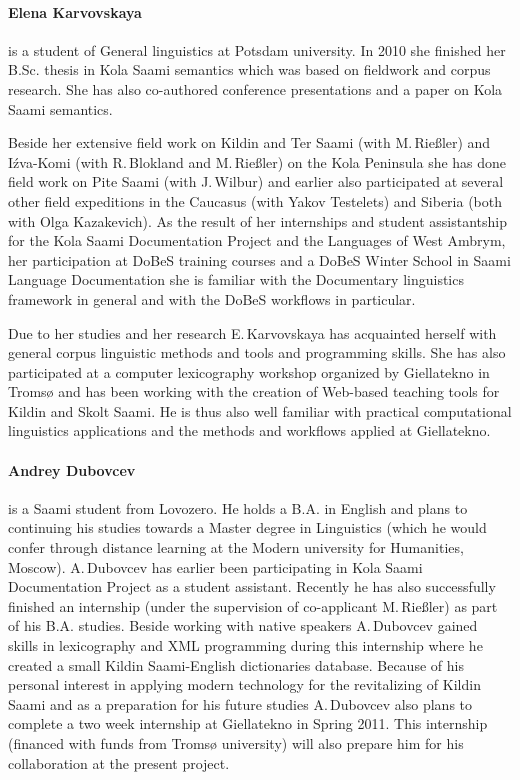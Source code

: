 \documentclass[a4paper,12pt]{article}
\begin{document}
{{{{\paragraph{Elena Karvovskaya} is a student of General linguistics at Potsdam university. In 2010 she finished her B.Sc. thesis in Kola Saami semantics which was based on fieldwork and corpus research. She has also co-authored conference presentations and a paper on Kola Saami semantics.

Beside her extensive field work on Kildin and Ter Saami (with M.\,Rießler) and Iźva-Komi (with R.\,Blokland and M.\,Rießler) on the Kola Peninsula she has done field work on Pite Saami (with J.\,Wilbur) and earlier also participated at several other field expeditions in the Caucasus (with Yakov Testelets) and Siberia (both with Olga Kazakevich). As the result of her internships and student assistantship for the Kola Saami Documentation Project and the Languages of West Ambrym, her participation at DoBeS training courses and a DoBeS Winter School in Saami Language Documentation she is familiar with the Documentary linguistics framework in general and with the DoBeS workflows in particular.

Due to her studies and her research E.\,Karvovskaya has acquainted herself with general corpus linguistic methods and tools and programming skills. She has also participated at a computer lexicography workshop organized by Giellatekno in Tromsø and has been working with the creation of Web-based teaching tools for Kildin and Skolt Saami. He is thus also well familiar with practical computational linguistics applications and the methods and workflows applied at Giellatekno.

\paragraph{Andrey Dubovcev} is a Saami student from Lovozero. He holds a B.A. in English and plans to continuing his studies towards a Master degree in Linguistics (which he would confer through distance learning at the Modern university for Humanities, Moscow). A.\,Dubovcev has earlier been participating in Kola Saami Documentation Project as a student assistant. Recently he has also successfully finished an internship (under the supervision of co-applicant M.\,Rießler) as part of his B.A. studies. Beside working with native speakers A.\,Dubovcev gained skills in lexicography and XML programming during this internship where he created a small Kildin Saami-English dictionaries database. Because of his personal interest in applying modern technology for the revitalizing of Kildin Saami and as a preparation for his future studies A.\,Dubovcev also plans to complete a two week internship at Giellatekno in Spring 2011. This internship (financed with funds from Tromsø university) will also prepare him for his collaboration at the present  project.

}}}}
\end{document}
